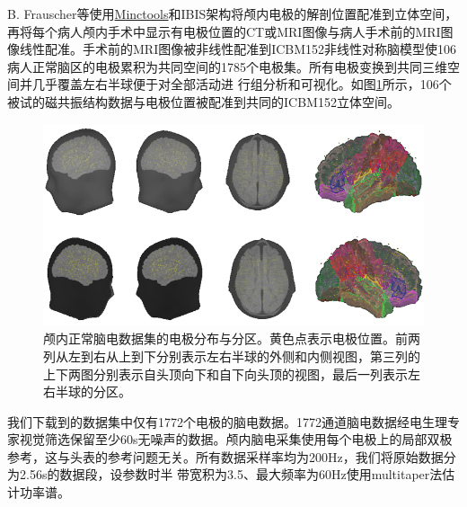 B. Frauscher等使用\href{www.bic.mni.mcgill.ca/ServicesSoftware/Services SoftwareMincToolKit}{Minctools}和IBIS架构将颅内电极的解剖位置配准到立体空间，再将每个病人颅内手术中显示有电极位置的CT或MRI图像与病人手术前的MRI图像线性配准。手术前的MRI图像被非线性配准到ICBM152非线性对称脑模型使106病人正常脑区的电极累积为共同空间的1785个电极集。所有电极变换到共同三维空间并几乎覆盖左右半球便于对全部活动进
行组分析和可视化。如图\ref{7:ele}所示，106个被试的磁共振结构数据与电极位置被配准到共同的ICBM152立体空间。
\begin{figure}[!h]
\includegraphics[width=15cm]{pic/xipi/electrodes.png}
\caption{颅内正常脑电数据集的电极分布与分区。黄色点表示电极位置。前两列从左到右从上到下分别表示左右半球的外侧和内侧视图，第三列的上下两图分别表示自头顶向下和自下向头顶的视图，最后一列表示左右半球的分区。}
\label{7:ele}
\end{figure}

我们下载到的数据集中仅有1772个电极的脑电数据。1772通道脑电数据经电生理专家视觉筛选保留至少60s无噪声的数据。颅内脑电采集使用每个电极上的局部双极参考，这与头表的参考问题无关。所有数据采样率均为200Hz，我们将原始数据分为2.56s的数据段，设参数时半
带宽积为3.5、最大频率为60Hz使用multitaper法估计功率谱。

